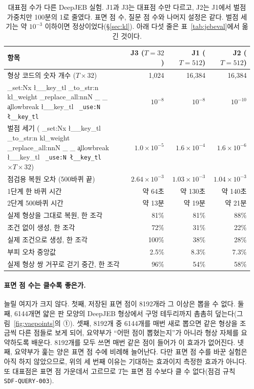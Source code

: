 \documentclass[11pt]{article}
\DeclareRobustCommand{\key}[1]{
  \tl_set:Nx \l__key_tl { \tl_to_str:n {#1} }
  \regex_replace_all:nnN { \_ } { \cO\_ \c{allowbreak} } \l__key_tl
  \texttt{ \tl_use:N \l__key_tl }
}
\begin{document}
\begin{table}[htbp]
\centering\small
\begin{tabular}{l r r r}
\toprule
항목 & J3 ($T=32$) & J1 ($T=512$) & J2 ($T=512$) \\
\midrule
형상 코드의 숫자 개수 ($T\times32$) & 1,024 & 16,384 & 16,384 \\
\key{kl_weight} & $10^{-8}$ & $10^{-8}$ & $10^{-10}$ \\
벌점 세기 (\key{kl_weight} $\times T\times32$) & $1.0\times10^{-5}$ & $1.6\times10^{-4}$ & $1.6\times10^{-6}$ \\
점검용 복원 오차 (500바퀴 끝) & $2.64\times10^{-3}$ & $1.03\times10^{-3}$ & $1.04\times10^{-3}$ \\
1단계 한 바퀴 시간 & 약 64초 & 약 130초 & 약 140초 \\
2단계 500바퀴 시간 & 약 13분 & 약 19분 & 약 21분 \\
\midrule
실제 형상을 그대로 복원, 한 조각 & 81\% & 81\% & 88\% \\
조건 없이 생성, 한 조각 & 72\% & 31\% & 22\% \\
실제 조건으로 생성, 한 조각 & 100\% & 38\% & 28\% \\
\quad 부피 오차 중앙값 & 2.5\% & 8.3\% & 7.3\% \\
실제 형상 쌍 거꾸로 걷기 중간, 한 조각 & 96\% & 54\% & 58\% \\
\bottomrule
\end{tabular}
\caption{대표점 수가 다른 DeepJEB 실험. J1과 J3는 대표점 수만 다르고, J2는 J1에서 벌점 가중치만 100분의 1로 줄였다.
표면 점 수, 질문 점 수와 나머지 설정은 같다. 벌점 세기는 약 $10^{-3}$ 이하이면 정상이었다(\S\ref{sec:kl}).
아래 다섯 줄은 표~\ref{tab:jebeval}에서 옮긴 것이다.}
\label{tab:tsize}
\end{table}

\paragraph{표면 점 수는 클수록 좋은가.} 늘릴 여지가 크지 않다. 첫째, 저장된 표면 점이 8192개라 그 이상은 뽑을 수 없다.
둘째, 6144개면 얇은 판 모양의 DeepJEB 형상에서 구멍 테두리까지 촘촘히 덮는다(그림~\ref{fig:vaepoints}의 ①).
셋째, 8192개 중 6144개를 매번 새로 뽑으면 같은 형상을 조금씩 다른 점들로 보게 되어, 요약부가 ``어떤 점이 뽑혔는지''가 아니라
형상 자체를 요약하도록 배운다. 8192개를 모두 쓰면 매번 같은 점이 들어가 이 효과가 없어진다. 넷째, 요약부가 훑는 양은
표면 점 수에 비례해 늘어난다. 다만 표면 점 수를 바꾼 실험은 아직 하지 않았으므로, 위의 세 번째 이유는 기대하는 효과이지
측정한 효과가 아니다. 또 대표점은 표면 점 가운데서 고르므로 $T$는 표면 점 수보다 클 수 없다(점검 규칙 \texttt{SDF-QUERY-003}).
\end{document}

